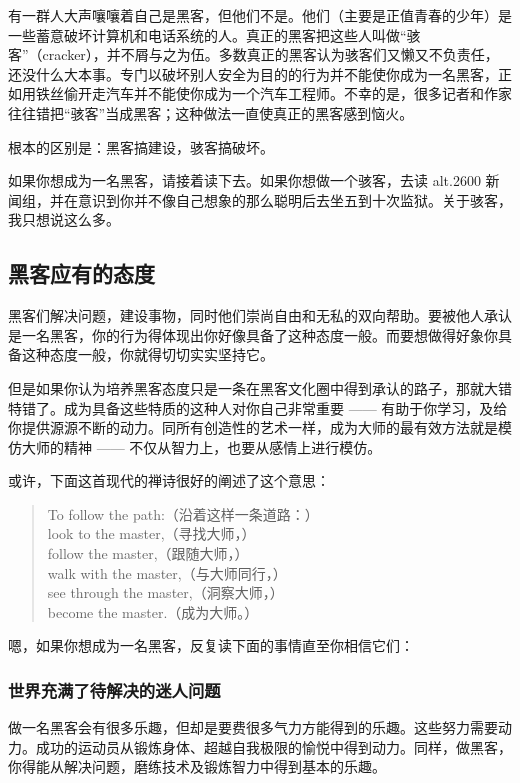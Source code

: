 有一群人大声嚷嚷着自己是黑客，但他们不是。他们（主要是正值青春的少年）是一些蓄意破坏计算机和电话系统的人。真正的黑客把这些人叫做“骇客”（cracker），并不屑与之为伍。多数真正的黑客认为骇客们又懒又不负责任，还没什么大本事。专门以破坏别人安全为目的的行为并不能使你成为一名黑客，正如用铁丝偷开走汽车并不能使你成为一个汽车工程师。不幸的是，很多记者和作家往往错把“骇客”当成黑客；这种做法一直使真正的黑客感到恼火。

根本的区别是：黑客搞建设，骇客搞破坏。

如果你想成为一名黑客，请接着读下去。如果你想做一个骇客，去读 alt.2600 新闻组，并在意识到你并不像自己想象的那么聪明后去坐五到十次监狱。关于骇客，我只想说这么多。


\subsection{黑客应有的态度}
黑客们解决问题，建设事物，同时他们崇尚自由和无私的双向帮助。要被他人承认是一名黑客，你的行为得体现出你好像具备了这种态度一般。而要想做得好象你具备这种态度一般，你就得切切实实坚持它。

但是如果你认为培养黑客态度只是一条在黑客文化圈中得到承认的路子，那就大错特错了。成为具备这些特质的这种人对你自己非常重要 —— 有助于你学习，及给你提供源源不断的动力。同所有创造性的艺术一样，成为大师的最有效方法就是模仿大师的精神 —— 不仅从智力上，也要从感情上进行模仿。

或许，下面这首现代的禅诗很好的阐述了这个意思：

\begin{verse}
    To follow the path:（沿着这样一条道路：）\\
    look to the master,（寻找大师，）\\
    follow the master,（跟随大师，）\\
    walk with the master,（与大师同行，）\\
    see through the master,（洞察大师，）\\
    become the master.（成为大师。）
\end{verse}

嗯，如果你想成为一名黑客，反复读下面的事情直至你相信它们：


\subsubsection{世界充满了待解决的迷人问题}
做一名黑客会有很多乐趣，但却是要费很多气力方能得到的乐趣。这些努力需要动力。成功的运动员从锻炼身体、超越自我极限的愉悦中得到动力。同样，做黑客，你得能从解决问题，磨练技术及锻炼智力中得到基本的乐趣。


